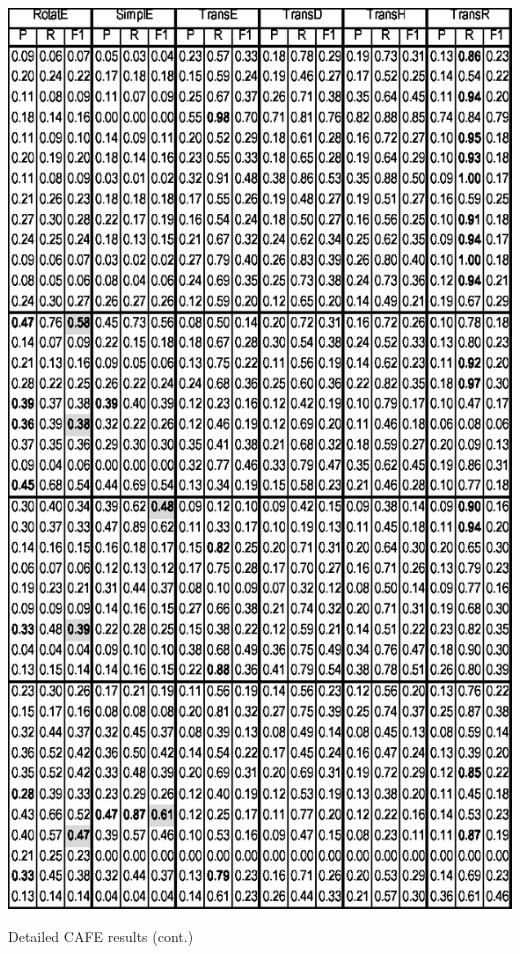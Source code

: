 \begin{table}[H]\ContinuedFloat
    \centering
    \includegraphics[height=0.8\paperheight,left]{fig/cafe/table-cafe-right}%
    \caption{Detailed CAFE results (cont.)}
\end{table}

      
